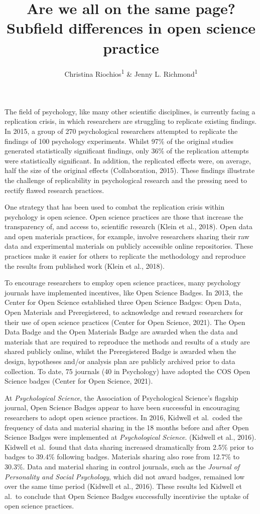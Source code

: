 \documentclass[
  english,
  man,floatsintext]{apa6}
\title{Are we all on the same page? Subfield differences in open science practice}
\author{Christina Riochios\textsuperscript{1} \& Jenny L. Richmond\textsuperscript{1}}
\date{}
\affiliation{\vspace{0.5cm}\textsuperscript{1} University of New South Wales}
\begin{document}
\maketitle

The field of psychology, like many other scientific disciplines, is currently facing a replication crisis, in which researchers are struggling to replicate existing findings. In 2015, a group of 270 psychological researchers attempted to replicate the findings of 100 psychology experiments. Whilst 97\% of the original studies generated statistically significant findings, only 36\% of the replication attempts were statistically significant. In addition, the replicated effects were, on average, half the size of the original effects (Collaboration, 2015). These findings illustrate the challenge of replicability in psychological research and the pressing need to rectify flawed research practices.

One strategy that has been used to combat the replication crisis within psychology is open science. Open science practices are those that increase the transparency of, and access to, scientific research (Klein et al., 2018). Open data and open materials practices, for example, involve researchers sharing their raw data and experimental materials on publicly accessible online repositories. These practices make it easier for others to replicate the methodology and reproduce the results from published work (Klein et al., 2018).

To encourage researchers to employ open science practices, many psychology journals have implemented incentives, like Open Science Badges. In 2013, the Center for Open Science established three Open Science Badges: Open Data, Open Materials and Preregistered, to acknowledge and reward researchers for their use of open science practices (Center for Open Science, 2021). The Open Data Badge and the Open Materials Badge are awarded when the data and materials that are required to reproduce the methods and results of a study are shared publicly online, whilst the Preregistered Badge is awarded when the design, hypotheses and/or analysis plan are publicly archived prior to data collection. To date, 75 journals (40 in Psychology) have adopted the COS Open Science badges (Center for Open Science, 2021).

At \emph{Psychological Science}, the Association of Psychological Science's flagship journal, Open Science Badges appear to have been successful in encouraging researchers to adopt open science practices. In 2016, Kidwell et al.~coded the frequency of data and material sharing in the 18 months before and after Open Science Badges were implemented at \emph{Psychological Science}. (Kidwell et al., 2016). Kidwell et al.~found that data sharing increased dramatically from 2.5\% prior to badges to 39.4\% following badges. Materials sharing also rose from 12.7\% to 30.3\%. Data and material sharing in control journals, such as the \emph{Journal of Personality and Social Psychology}, which did not award badges, remained low over the same time period (Kidwell et al., 2016). These results led Kidwell et al.~to conclude that Open Science Badges successfully incentivise the uptake of open science practices.
\end{document}
